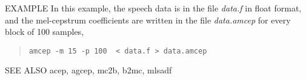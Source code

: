\begin{qsection}{EXAMPLE}
	In this example, the speech data is in the file {\em data.f}
        in float format, and the mel-cepstrum coefficients are written in
        the file {\em data.amcep} for every block of 100 samples,
\begin{quote}
 \verb!amcep -m 15 -p 100  < data.f > data.amcep!
\end{quote} 
\end{qsection}

\begin{qsection}{SEE ALSO}
acep, agcep, mc2b, b2mc, mlsadf
\end{qsection}
